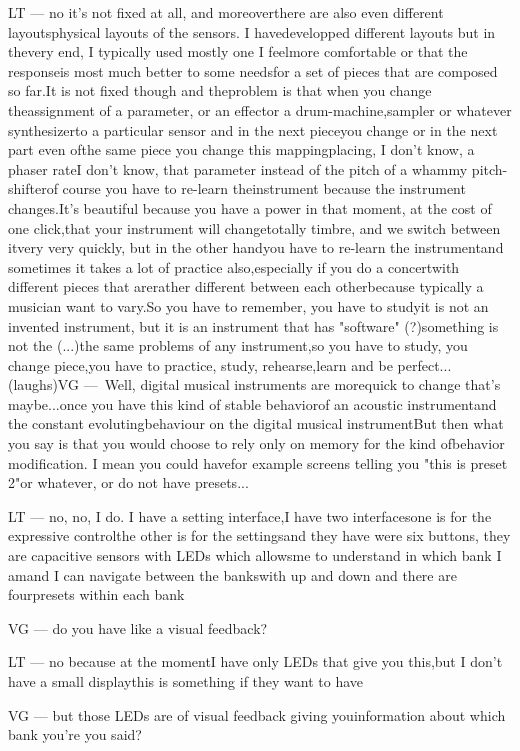 LT — no it's not fixed at all, and moreoverthere are also even different layoutsphysical layouts of the sensors. I havedevelopped different layouts but in thevery end, I typically used mostly one I feelmore comfortable or that the responseis most much better to some needsfor a set of pieces that are composed so far.It is not fixed though and theproblem is that when you change theassignment of a parameter, or an effector a drum-machine,sampler or whatever synthesizerto a particular sensor and in the next pieceyou change or in the next part even ofthe same piece you change this mappingplacing, I don't know, a phaser rateI don't know, that parameter instead of the pitch of a whammy pitch-shifterof course you have to re-learn theinstrument because the instrument changes.It's beautiful because you have a power in that moment, at the cost of one click,that your instrument will changetotally timbre, and we switch between itvery very quickly, but in the other handyou have to re-learn the instrumentand sometimes it takes a lot of practice also,especially if you do a concertwith different pieces that arerather different between each otherbecause typically a musician want to vary.So you have to remember, you have to studyit is not an invented instrument, but it is an instrument that has "software" (?)something is not the (...)the same problems of any instrument,so you have to study, you change piece,you have to practice, study, rehearse,learn and be perfect... (laughs)VG — Well, digital musical instruments are morequick to change that's maybe...once you have this kind of stable behaviorof an acoustic instrumentand the constant evolutingbehaviour on the digital musical instrumentBut then what you say is that you would choose to rely only on memory for the kind ofbehavior modification. I mean you could havefor example screens telling you "this is preset 2"or whatever, or do not have presets...

LT — no, no, I do. I have a setting interface,I have two interfacesone is for the expressive controlthe other is for the settingsand they have were six buttons, they are capacitive sensors with LEDs which allowsme to understand in which bank I amand I can navigate between the bankswith up and down and there are fourpresets within each bank

VG — do you have like a visual feedback?

LT — no because at the momentI have only LEDs that give you this,but I don't have a small displaythis is something if they want to have

VG — but those LEDs are of visual feedback giving youinformation about which bank you're you said?


